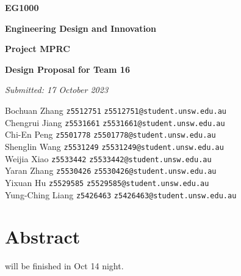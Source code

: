 \documentclass[12pt]{article}
\begin{document}
\begin{titlepage}
    \centering
    \vspace{1cm}
    {\Large \textbf{EG1000} \par}
    \vspace{0.5cm}
    {\Large \textbf{Engineering Design and Innovation} \par}
    \vspace{4cm}
    {\Huge \textbf{Project MPRC} \par}
    \vspace{0.8cm}
    {\Large \textbf{Design Proposal for Team 16} \par}
    \vfill
    {\large \textit{Submitted: 17 October 2023} \par}
    \vspace{1cm}
    \begin{tabbing}
        Bochuan Zhang \hspace{2cm} \= \texttt{z5512751} \hspace{2cm} \= \texttt{z5512751@student.unsw.edu.au} \\[10pt]
        Chengrui Jiang\> \texttt{z5531661} \> \texttt{z5531661@student.unsw.edu.au} \\[10pt]
        Chi-En Peng \> \texttt{z5501778} \> \texttt{z5501778@student.unsw.edu.au} \\[10pt]
        Shenglin Wang \> \texttt{z5531249} \> \texttt{z5531249@student.unsw.edu.au} \\[10pt]
        Weijia Xiao \> \texttt{z5533442} \> \texttt{z5533442@student.unsw.edu.au} \\[10pt]
        Yaran Zhang \> \texttt{z5530426} \> \texttt{z5530426@student.unsw.edu.au} \\[10pt]
        Yixuan Hu \> \texttt{z5529585} \> \texttt{z5529585@student.unsw.edu.au} \\[10pt]
        Yung-Ching Liang \> \texttt{z5426463} \> \texttt{z5426463@student.unsw.edu.au} \\[10pt]
    \end{tabbing}
    \vfill
\end{titlepage}

\newpage

\section*{Abstract}
will be finished in Oct 14 night.
\tableofcontents
\newpage
{}
\end{document}
